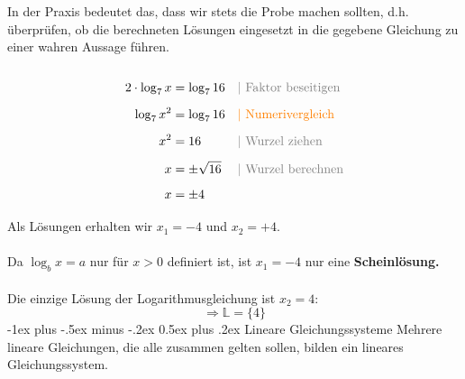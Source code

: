 \documentclass[a4paper,10pt]{article}
\makeatletter
\renewcommand{\section}{\@startsection{section}{1}{0mm}%
                                {-1ex plus -.5ex minus -.2ex}%
                                {0.5ex plus .2ex}%
                                {\normalfont\large\bfseries}}
\makeatother
\begin{document}
\begin{multicols}{3}
    In der Praxis bedeutet das, dass wir stets die Probe machen sollten, d.h. überprüfen, ob die berechneten Lösungen eingesetzt in die gegebene Gleichung zu einer wahren Aussage führen.\\~\\
    \begin{align*} 2 \cdot \log_{7}x &= \log_{7}16 &&{\color{gray}|\text{ Faktor beseitigen}} \\[5px] \log_{7}x^2 &= \log_{7}16 &&{\color{orange}|\text{ Numerivergleich}} \\[5px] x^2 &= 16 &&{\color{gray}|\text{ Wurzel ziehen}} \\[5px] x &= \pm \sqrt{16} &&{\color{gray}|\text{ Wurzel berechnen}} \\[5px] x &= \pm 4 \\[5px] \end{align*}
    Als Lösungen erhalten wir $x_1 = -4$ und $x_2 = +4$.\\~\\

    Da $\log_{b}x = a$ nur für $x > 0$ definiert ist, ist $x_1 = -4$ nur eine \textbf{Scheinlösung.}\\~\\

    Die einzige Lösung der Logarithmusgleichung ist $x_2 = 4$:\\
    \[\Rightarrow \mathbb{L} = \{4\}\]
    \section{Lineare Gleichungs­systeme}
    Mehrere lineare Gleichungen, die alle zusammen gelten sollen, bilden ein lineares Gleichungssystem.\\

\end{multicols}
\end{document}
